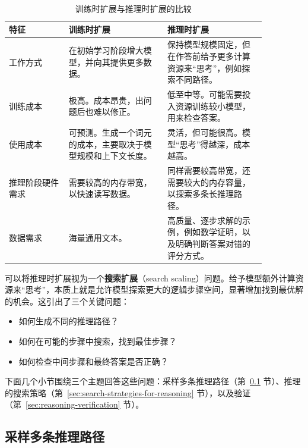 \begin{table}[t]
\centering
\begingroup
\renewcommand{\arraystretch}{1.3}
\begin{tabular}{R{0.20\linewidth} | L{0.33\linewidth} | L{0.33\linewidth}}
特征 & 训练时扩展 & 推理时扩展 \\
\hline
工作方式 & 在初始学习阶段增大模型，并向其提供更多数据。 & 保持模型规模固定，但在作答前给予更多计算资源来“思考”，例如探索不同路径。 \\ \hline
训练成本 & 极高。成本昂贵，出问题后也难以修正。 & 低至中等。可能需要投入资源训练较小模型，用来检查答案。 \\ \hline
使用成本 & 可预测。生成一个词元的成本，主要取决于模型规模和上下文长度。 & 灵活，但可能很高。模型“思考”得越深，成本越高。\\ \hline
推理阶段硬件需求 & 需要较高的内存带宽，以快速读写数据。 & 同样需要较高带宽，还需要较大的内存容量，以探索多条长推理路径。 \\ \hline
数据需求 & 海量通用文本。 & 高质量、逐步求解的示例，例如数学证明，以及明确判断答案对错的评分方式。
\end{tabular}
\caption{训练时扩展与推理时扩展的比较}
\label{tab:scaling-comparison}
\endgroup
\end{table}

可以将推理时扩展视为一个\textbf{搜索扩展}（search scaling）问题。给予模型额外计算资源来“思考”，本质上就是允许模型探索更大的逻辑步骤空间，显著增加找到最优解的机会。这引出了三个关键问题：

\begin{itemize}
\item \vspace{0.5em} 如何生成不同的推理路径？
\item \vspace{0.3em} 如何在可能的步骤中搜索，找到最佳步骤？
\item \vspace{0.3em} 如何检查中间步骤和最终答案是否正确？
\end{itemize}
\vspace{0.5em}

下面几个小节围绕三个主题回答这些问题：采样多条推理路径（第~\ref{sec:sampling-reasoning-paths} 节）、推理的搜索策略（第~\ref{sec:search-strategies-for-reasoning} 节），以及验证（第~\ref{sec:reasoning-verification} 节）。

\subsection{采样多条推理路径}
\label{sec:sampling-reasoning-paths}

